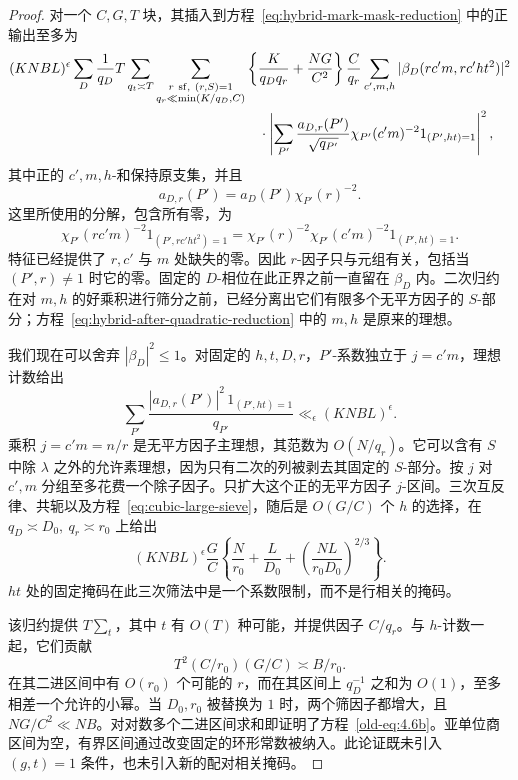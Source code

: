 \documentclass[11pt,a4paper]{article}
\numberwithin{equation}{section}
\numberwithin{figure}{section}
\theoremstyle{definition}
\theoremstyle{remark}
\begin{document}
\begin{proof}
对一个 \(C,G,T\) 块，其插入到方程~\eqref{eq:hybrid-mark-mask-reduction} 中的正输出至多为
\begin{equation}\label{eq:hybrid-after-quadratic-reduction}
 \begin{split}
 (KNBL)^\epsilon\sum_D\frac1{q_D}T\sum_{q_t\asymp T}
 \sum_{\substack{r\ {\rm sf},\ (r,S)=1\\q_r\ll\min(K/q_D,C)}}
 &\left\{\frac K{q_Dq_r}+\frac{NG}{C^2}\right\}\frac C{q_r}
 \sum_{c',m,h}|\beta_D(rc'm,rc'ht^2)|^2\\
 &\quad\cdot\left|
 \sum_{P'}\frac{a_{D,r}(P')}{\sqrt{q_{P'}}}
       \chi_{P'}(c'm)^{-2}1_{(P',ht)=1}
 \right|^2,
 \end{split}
\end{equation}
其中正的 \(c',m,h\)-和保持原支集，并且
\[
 a_{D,r}(P')=a_D(P')\chi_{P'}(r)^{-2}.
\]
这里所使用的分解，包含所有零，为
\[
 \chi_{P'}(rc'm)^{-2}1_{(P',rc'ht^2)=1}
 =\chi_{P'}(r)^{-2}\chi_{P'}(c'm)^{-2}1_{(P',ht)=1}.
\]
特征已经提供了 \(r,c'\) 与 \(m\) 处缺失的零。因此 \(r\)-因子只与元组有关，包括当 \((P',r)\ne1\) 时它的零。固定的 \(D\)-相位在此正界之前一直留在 \(\beta_D\) 内。二次归约在对 \(m,h\) 的好乘积进行筛分之前，已经分离出它们有限多个无平方因子的 \(S\)-部分；方程~\eqref{eq:hybrid-after-quadratic-reduction} 中的 \(m,h\) 是原来的理想。

我们现在可以舍弃 \(|\beta_D|^2\le1\)。对固定的 \(h,t,D,r\)，\(P'\)-系数独立于 \(j=c'm\)，理想计数给出
\[
 \sum_{P'}\frac{|a_{D,r}(P')|^2\,1_{(P',ht)=1}}{q_{P'}}
 \ll_\epsilon (KNBL)^\epsilon.
\]
乘积 \(j=c'm=n/r\) 是无平方因子主理想，其范数为 \(O(N/q_r)\)。它可以含有 \(S\) 中除 \(\lambda\) 之外的允许素理想，因为只有二次的列被剥去其固定的 \(S\)-部分。按 \(j\) 对 \(c',m\) 分组至多花费一个除子因子。只扩大这个正的无平方因子 \(j\)-区间。三次互反律、共轭以及方程~\eqref{eq:cubic-large-sieve}，随后是 \(O(G/C)\) 个 \(h\) 的选择，在 \(q_D\asymp D_0,\ q_r\asymp r_0\) 上给出
\begin{equation}\label{old-eq:4.6c}
 (KNBL)^\epsilon\frac GC
 \left\{\frac N{r_0}+\frac L{D_0}
       +\left(\frac{NL}{r_0D_0}\right)^{2/3}\right\}.
\end{equation}
\(ht\) 处的固定掩码在此三次筛法中是一个系数限制，而不是行相关的掩码。

该归约提供 \(T\sum_t\)，其中 \(t\) 有 \(O(T)\) 种可能，并提供因子 \(C/q_r\)。与 \(h\)-计数一起，它们贡献
\[
 T^2(C/r_0)(G/C)\asymp B/r_0.
\]
在其二进区间中有 \(O(r_0)\) 个可能的 \(r\)，而在其区间上 \(q_D^{-1}\) 之和为 \(O(1)\)，至多相差一个允许的小幂。当 \(D_0,r_0\) 被替换为 \(1\) 时，两个筛因子都增大，且 \(NG/C^2\ll NB\)。对对数多个二进区间求和即证明了方程~\eqref{old-eq:4.6b}。亚单位商区间为空，有界区间通过改变固定的环形常数被纳入。此论证既未引入 \((g,t)=1\) 条件，也未引入新的配对相关掩码。
\end{proof}
\end{document}
